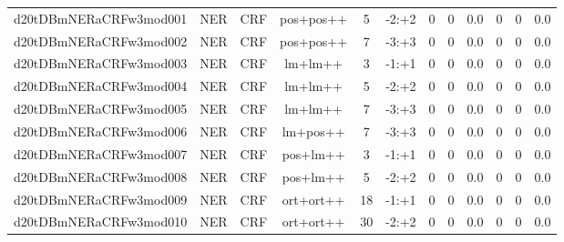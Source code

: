 \documentclass[a4paper]{article}
\begin{document}
\begin{landscape}
\begin{center}
\begin{tabular}{ |c|c|c|c|c|c|c|c|c|c|c|c|}
 
 	
 	\small{ d20tDBmNERaCRFw3mod001 } & \small{ NER} & \small{  CRF }  & pos+pos++  &  5 &  \small{  -2:+2 }  &  0 & 0 & 0.0  &  0 & 0 & 0.0 \\
 	

 
 	
 	\small{ d20tDBmNERaCRFw3mod002 } & \small{ NER} & \small{  CRF }  & pos+pos++  &  7 &  \small{  -3:+3 }  &  0 & 0 & 0.0  &  0 & 0 & 0.0 \\
 	

 
 	
 	\small{ d20tDBmNERaCRFw3mod003 } & \small{ NER} & \small{  CRF }  & lm+lm++  &  3 &  \small{  -1:+1 }  &  0 & 0 & 0.0  &  0 & 0 & 0.0 \\
 	

 
 	
 	\small{ d20tDBmNERaCRFw3mod004 } & \small{ NER} & \small{  CRF }  & lm+lm++  &  5 &  \small{  -2:+2 }  &  0 & 0 & 0.0  &  0 & 0 & 0.0 \\
 	

 
 	
 	\small{ d20tDBmNERaCRFw3mod005 } & \small{ NER} & \small{  CRF }  & lm+lm++  &  7 &  \small{  -3:+3 }  &  0 & 0 & 0.0  &  0 & 0 & 0.0 \\
 	

 
 	
 	\small{ d20tDBmNERaCRFw3mod006 } & \small{ NER} & \small{  CRF }  & lm+pos++  &  7 &  \small{  -3:+3 }  &  0 & 0 & 0.0  &  0 & 0 & 0.0 \\
 	

 
 	
 	\small{ d20tDBmNERaCRFw3mod007 } & \small{ NER} & \small{  CRF }  & pos+lm++  &  3 &  \small{  -1:+1 }  &  0 & 0 & 0.0  &  0 & 0 & 0.0 \\
 	

 
 	
 	\small{ d20tDBmNERaCRFw3mod008 } & \small{ NER} & \small{  CRF }  & pos+lm++  &  5 &  \small{  -2:+2 }  &  0 & 0 & 0.0  &  0 & 0 & 0.0 \\
 	

 
 	
 	\small{ d20tDBmNERaCRFw3mod009 } & \small{ NER} & \small{  CRF }  & ort+ort++  &  18 &  \small{  -1:+1 }  &  0 & 0 & 0.0  &  0 & 0 & 0.0 \\
 	

 
 	
 	\small{ d20tDBmNERaCRFw3mod010 } & \small{ NER} & \small{  CRF }  & ort+ort++  &  30 &  \small{  -2:+2 }  &  0 & 0 & 0.0  &  0 & 0 & 0.0 \\
 	


\end{tabular}
\end{center}
\end{landscape}
\end{document}
